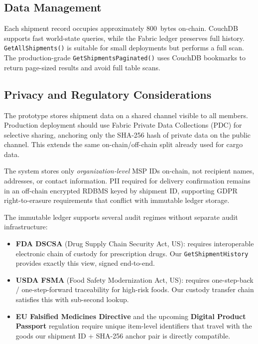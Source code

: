 \documentclass[conference]{IEEEtran}
\begin{document}
\subsection{Data Management}

Each shipment record occupies approximately 800~bytes on-chain. CouchDB
supports fast world-state queries, while the Fabric ledger preserves full
history. \texttt{GetAllShipments()} is suitable for small deployments but
performs a full scan. The production-grade
\texttt{GetShipmentsPaginated()} uses CouchDB bookmarks to return
page-sized results and avoid full table scans.

\subsection{Privacy and Regulatory Considerations}

The prototype stores shipment data on a shared channel visible to all
members. Production deployment should use Fabric Private Data Collections
(PDC) for selective sharing, anchoring only the SHA-256 hash of private data
on the public channel. This extends the same on-chain/off-chain split already
used for cargo data.

The system stores only \emph{organization-level} MSP IDs on-chain, not
recipient names, addresses, or contact information. PII required for delivery
confirmation remains in an off-chain encrypted RDBMS keyed by shipment ID,
supporting GDPR right-to-erasure requirements that conflict with immutable
ledger storage.

The immutable ledger supports several audit regimes without separate audit
infrastructure:
\begin{itemize}
  \item \textbf{FDA DSCSA} (Drug Supply Chain Security Act, US): requires
    interoperable electronic chain of custody for prescription drugs.
    Our \texttt{GetShipmentHistory} provides exactly this view, signed
    end-to-end.
  \item \textbf{USDA FSMA} (Food Safety Modernization Act, US): requires
    one-step-back / one-step-forward traceability for high-risk foods.
    Our custody transfer chain satisfies this with sub-second lookup.
  \item \textbf{EU Falsified Medicines Directive} and the upcoming
    \textbf{Digital Product Passport} regulation require unique
    item-level identifiers that travel with the goods  our shipment
    ID + SHA-256 anchor pair is directly compatible.
\end{itemize}
\end{document}
